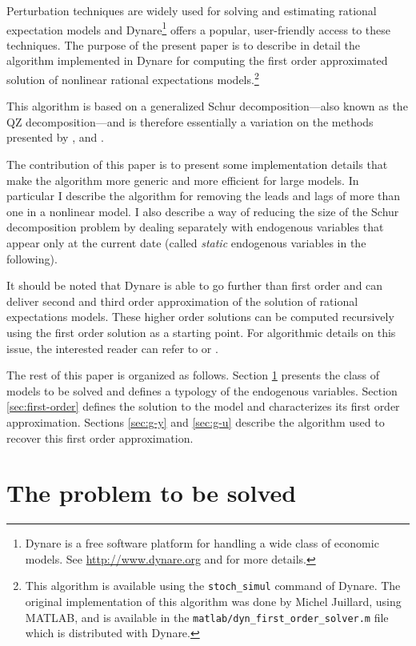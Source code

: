\documentclass[11pt,a4paper]{article}
\begin{document}
Perturbation techniques are widely used for solving and estimating rational
expectation models and Dynare\footnote{Dynare is a free software platform for
  handling a wide class of economic models. See \url{http://www.dynare.org} and
  \citet{adjemian/al:2011} for more details.} offers a popular, user-friendly
access to these techniques. The purpose of the present paper is to describe in
detail the algorithm implemented in Dynare for computing the first order
approximated solution of nonlinear rational expectations models.\footnote{This
  algorithm is available using the \texttt{stoch\_simul} command of Dynare. The
  original implementation of this algorithm was done by Michel Juillard, using
  MATLAB, and is available in the \texttt{matlab/dyn\_first\_order\_solver.m} file which is
  distributed with Dynare.}

This algorithm is based on a generalized Schur decomposition---also known as
the QZ decomposition---and is therefore essentially a variation on the
methods presented by \citet{klein:2000}, \citet{sims:2001} and
\citet{uhlig:1999}.

The contribution of this paper is to present some implementation details that
make the algorithm more generic and more efficient for large models. In
particular I describe the algorithm for removing the leads and lags of more
than one in a nonlinear model. I also describe a way of reducing the size of
the Schur decomposition problem by dealing separately with endogenous variables
that appear only at the current date (called \emph{static} endogenous variables
in the following).

It should be noted that Dynare is able to go further than first order and can
deliver second and third order approximation of the solution of rational
expectations models. These higher order solutions can be computed recursively
using the first order solution as a starting point. For algorithmic details on
this issue, the interested reader can refer to
\citet{collard/juillard:2001:compecon} or \citet{schmitt-grohe/uribe:2004}.

The rest of this paper is organized as follows. Section \ref{sec:model}
presents the class of models to be solved and defines a typology of the
endogenous variables. Section \ref{sec:first-order} defines the solution
to the model and characterizes its first order approximation. Sections
\ref{sec:g-y} and \ref{sec:g-u} describe the algorithm used to recover this
first order approximation.

\section{The problem to be solved}
\label{sec:model}
\end{document}
